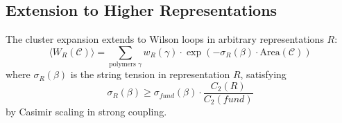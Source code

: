 \subsection{Extension to Higher Representations}

The cluster expansion extends to Wilson loops in arbitrary representations $R$:
\begin{equation}
    \langle W_R(\mathcal{C}) \rangle = \sum_{\text{polymers } \gamma} w_R(\gamma) \cdot \exp\left( -\sigma_R(\beta) \cdot \text{Area}(\mathcal{C}) \right)
\end{equation}
where $\sigma_R(\beta)$ is the string tension in representation $R$, satisfying
\begin{equation}
    \sigma_R(\beta) \geq \sigma_{fund}(\beta) \cdot \frac{C_2(R)}{C_2(fund)}
\end{equation}
by Casimir scaling in strong coupling.


